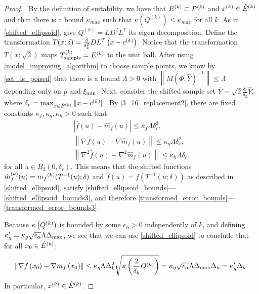\documentclass{article}
\begin{document}
\begin{proof}
\
By the definition of suitability, we have that ${E^{(k)}} \subset {{\mathcal{P}}^{(k)}}$ and $x^{(k)} \in {{\hat E}^{(k)}}$ and that there is a bound $\kappa_{max}$ such that $\kappa(Q^{(k)})\le \kappa_{max}$ for all $k$.
As in \cref{shifted_ellipsoid},  give $Q^{(k)} = LD^2L^T$ its eigen-decomposition.
Define the transformation $T(x; \delta) = \frac{\delta}{\delta_k^2} D L^T\left(x - c^{(k)}\right)$.
Notice that 
the transformation $T\left(x; \sqrt{2}\right)$ maps ${T_{\text{sample}}^{(k)}} = {E^{(k)}}$ to the unit ball.
After using \cref{model_improving_algorithm} to choose sample points, we know by \cref{set_is_poised}
that there is a bound $\Lambda>0$ with $\left\| M\left(\bar \Phi, \hat Y\right)^{-1}\right\| \le \Lambda$ depending only on $p$ and $\xi_{\text{min}}$.
Next,  consider the shifted sample set $\bar Y = \sqrt{2}\frac{\delta_r}{\delta_2} \hat Y$, where $\delta_r = \max_{x \in {{\hat E}^{(k)}}}\|x - c^{(k)}\|$.
By \cref{3_16_replacement2},  there are fixed constants $\kappa_f, \kappa_g, \kappa_h > 0$ such that
\begin{align*}
\left| \hat {f}\left(u\right) - \hat{m}_f\left(u\right) \right|\le \kappa_f\Lambda \delta_r^3, \\
\left\|\nabla \hat {f}\left(u\right) - \nabla \hat{m}_f\left(u\right) \right\|\le \kappa_g\Lambda \delta_r^2, \\
\left\|\nabla^2 \hat {f}\left(u\right) - \nabla^2 \hat{m}_f\left(u\right) \right\|\le \kappa_h\Lambda \delta_r.
\end{align*}
for all $u \in B_2\left(0, \delta_r\right)$.
This means that the shifted functions
$\hat {m}_f^{(k)}(u) = {{m}_f}^{(k)}(T^{-1}(u); \delta)$ and
$\hat f (u) = f(T^{-1}(u; \delta))$
as described in \cref{shifted_ellipsoid},
satisfy \cref{shifted_ellipsoid_bounds}---\cref{shifted_ellipsoid_bounds3},
and therefore \cref{transformed_error_bounds}---\cref{transformed_error_bounds3}.


Because ${\kappa} \left({Q^{(k)}}\right)$ is bounded by some $\epsilon_{\alpha} > 0$ independently of $k$,
and defining $\kappa'_{g} =  \kappa_g\sqrt{\epsilon_{\alpha}}\Lambda{\Delta_{\textrm{max}}}$, we see that
we can use  \cref{shifted_ellipsoid} to conclude that for all $x_0 \in {{\hat E}^{(k)}}$:
\begin{align*}
\left\|\nabla f\left(x_0 \right) - \nabla m_f\left(x_0\right)\right\| \le 
\kappa_g  \Lambda\Delta_k^2 \sqrt{{\kappa} \left(\frac 2 {\delta_k} Q^{(k)}\right)}
=  \kappa_g \sqrt{\epsilon_{\alpha}}\Lambda{\Delta_{\textrm{max}}}\Delta_k 
= \kappa'_g\Delta_k.
\end{align*}
In particular, $x^{(k)} \in {{\hat E}^{(k)}}$.
\end{proof}
\end{document}
